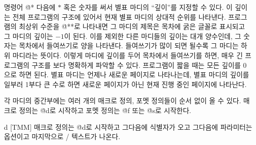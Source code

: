 \more
명령어 \.{@*} 다음에 $*$ 혹은 숫자를 써서 별표 마디의 ``깊이''를
지정할 수 있다. 이 깊이는 전체 프로그램의 구조에
있어서 현재 별표 마디의 상대적 순위를 나타낸다. 프로그램의 최상위
수준을 \.{@**}로 나타내면 그 마디의 제목은 목차에 굵은 글꼴로 표시되고
그 마디의 깊이는 $-1$이 된다. 이를 제외한 다른 마디들의 깊이는 대개
양수인데, 그 숫자는 목차에서 들여쓰기로 양을 나타낸다. 들여쓰기가 많이
되면 될수록 그 마디는 하위 마디라는 뜻이다. 이렇게 마디에 깊이를
두어 목차에서 들여쓰기를 하면, 매우 긴 프로그램의 구조를 보다 명확하게
파악할 수 있다. 프로그램이 짧을 때는 모든 깊이를 0으로 하면 된다. 별표
마디는 언제나 새로운 페이지로 나타나는데, 별표 마디의 깊이를 일부러
1부다 큰 수로 하면 새로운 페이지가 아닌 현재 진행 중인 페이지에
나타난다.
 
\subsec
각 마디의 중간부에는 여러 개의 매크로 정의, 포멧 정의들이 순서 없이 올
수 있다. 매크로 정의는 \.{@d}로 시작하고 포멧 정의는 \.{@f}
또는 \.{@s}로 시작한다.

\@{d} [TM\to M] 매크로 정의는 \.{@d}로 시작하고 그다음에 식별자가
오고 그다음에 파라미터는 옵션이고 마지막으로 \CEE/
텍스트가 나온다. 


